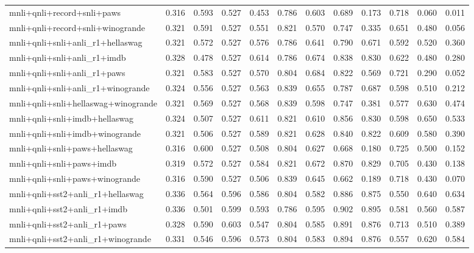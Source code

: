 \begin{table}[t]
\begin{tabular}{lrrrrrrrrrrr}
    mnli+qnli+record+snli+paws & 0.316 & 0.593 & 0.527 & 0.453 & 0.786 & 0.603 & 0.689 & 0.173 & 0.718 & 0.060 & 0.011 \\
    mnli+qnli+record+snli+winogrande & 0.321 & 0.591 & 0.527 & 0.551 & 0.821 & 0.570 & 0.747 & 0.335 & 0.651 & 0.480 & 0.056 \\
    mnli+qnli+snli+anli\_r1+hellaswag & 0.321 & 0.572 & 0.527 & 0.576 & 0.786 & 0.641 & 0.790 & 0.671 & 0.592 & 0.520 & 0.360 \\
    mnli+qnli+snli+anli\_r1+imdb & 0.328 & 0.478 & 0.527 & 0.614 & 0.786 & 0.674 & 0.838 & 0.830 & 0.622 & 0.480 & 0.280 \\
    mnli+qnli+snli+anli\_r1+paws & 0.321 & 0.583 & 0.527 & 0.570 & 0.804 & 0.684 & 0.822 & 0.569 & 0.721 & 0.290 & 0.052 \\
    mnli+qnli+snli+anli\_r1+winogrande & 0.324 & 0.556 & 0.527 & 0.563 & 0.839 & 0.655 & 0.787 & 0.687 & 0.598 & 0.510 & 0.212 \\
    mnli+qnli+snli+hellaswag+winogrande & 0.321 & 0.569 & 0.527 & 0.568 & 0.839 & 0.598 & 0.747 & 0.381 & 0.577 & 0.630 & 0.474 \\
    mnli+qnli+snli+imdb+hellaswag & 0.324 & 0.507 & 0.527 & 0.611 & 0.821 & 0.610 & 0.856 & 0.830 & 0.598 & 0.650 & 0.533 \\
    mnli+qnli+snli+imdb+winogrande & 0.321 & 0.506 & 0.527 & 0.589 & 0.821 & 0.628 & 0.840 & 0.822 & 0.609 & 0.580 & 0.390 \\
    mnli+qnli+snli+paws+hellaswag & 0.316 & 0.600 & 0.527 & 0.508 & 0.804 & 0.627 & 0.668 & 0.180 & 0.725 & 0.500 & 0.152 \\
    mnli+qnli+snli+paws+imdb & 0.319 & 0.572 & 0.527 & 0.584 & 0.821 & 0.672 & 0.870 & 0.829 & 0.705 & 0.430 & 0.138 \\
    mnli+qnli+snli+paws+winogrande & 0.316 & 0.590 & 0.527 & 0.506 & 0.839 & 0.645 & 0.662 & 0.189 & 0.718 & 0.430 & 0.070 \\
    mnli+qnli+sst2+anli\_r1+hellaswag & 0.336 & 0.564 & 0.596 & 0.586 & 0.804 & 0.582 & 0.886 & 0.875 & 0.550 & 0.640 & 0.634 \\
    mnli+qnli+sst2+anli\_r1+imdb & 0.336 & 0.501 & 0.599 & 0.593 & 0.786 & 0.595 & 0.902 & 0.895 & 0.581 & 0.560 & 0.587 \\
    mnli+qnli+sst2+anli\_r1+paws & 0.328 & 0.590 & 0.603 & 0.547 & 0.804 & 0.585 & 0.891 & 0.876 & 0.713 & 0.510 & 0.389 \\
    mnli+qnli+sst2+anli\_r1+winogrande & 0.331 & 0.546 & 0.596 & 0.573 & 0.804 & 0.583 & 0.894 & 0.876 & 0.557 & 0.620 & 0.584 \\

\end{tabular}
\end{table}
